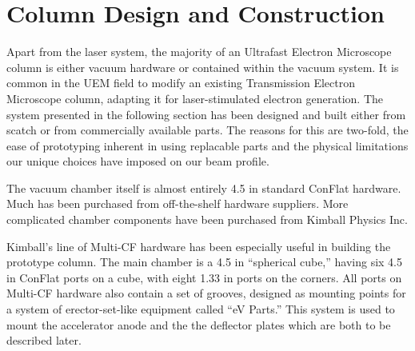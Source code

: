 
\section{Column Design and Construction}

Apart from the laser system, the majority of an Ultrafast Electron Microscope column is either vacuum hardware or contained within the vacuum system.
It is common in the UEM field to modify an existing Transmission Electron Microscope column, adapting it for laser-stimulated electron generation.
The system presented in the following section has been designed and built either from scatch or from commercially available parts.
The reasons for this are two-fold, the ease of prototyping inherent in using replacable parts and the physical limitations our unique choices have imposed on our beam profile.

The vacuum chamber itself is almost entirely 4.5 in standard ConFlat hardware.
Much has been purchased from off-the-shelf hardware suppliers.
More complicated chamber components have been purchased from Kimball Physics Inc.

Kimball's line of Multi-CF hardware has been especially useful in building the prototype column.
The main chamber is a 4.5 in ``spherical cube,'' having six 4.5 in ConFlat ports on a cube, with eight 1.33 in ports on the corners.
All ports on Multi-CF hardware also contain a set of grooves, designed as mounting points for a system of erector-set-like equipment called ``eV Parts.''
This system is used to mount the accelerator anode and the the deflector plates which are both to be described later.


